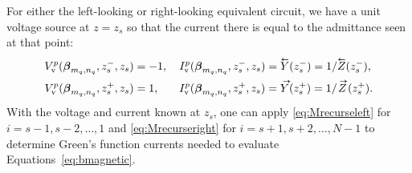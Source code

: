 For either the left-looking or right-looking equivalent circuit, 
we have a unit voltage source at $z=z_s$ so that the
current there is equal to the admittance seen at that point:
\begin{subequations}
\begin{align}
  \Vv^{p}(\vecbeta_{m_q,n_q},z_s^-,z_s) &= -1, \quad
  \Iv^{p}(\vecbeta_{m_q,n_q},z_s^-,z_s) = \Yleft(z_s^-) = 1/\Zleft(z_s^-), \\
  \Vv^{p}(\vecbeta_{m_q,n_q},z_s^+,z_s) &= 1, \quad \hphantom{-}
  \Iv^{p}(\vecbeta_{m_q,n_q},z_s^+,z_s) = \Yright(z_s^+) = 1/\Zright(z_s^+).
\end{align}
\end{subequations}
With the voltage and current known at $z_s$, one can apply 
\eqref{eq:Mrecurseleft} for $i=s-1, s-2, \ldots, 1$ and 
\eqref{eq:Mrecurseright} for $i=s+1, s+2, \ldots, N-1$ to determine
Green's function currents needed to evaluate Equations~\eqref{eq:bmagnetic}.
  
